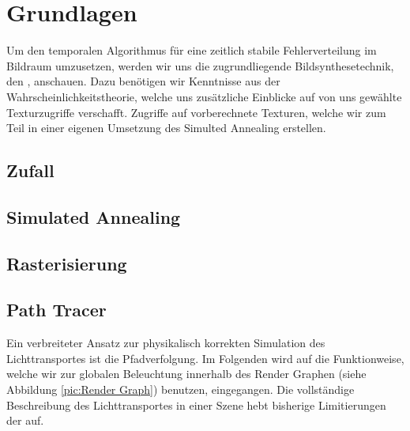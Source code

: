 \vfill
\chapter{Grundlagen}
\label{ch:Grundlagen}
Um den temporalen Algorithmus für eine zeitlich stabile  Fehlerverteilung im Bildraum umzusetzen, werden wir uns 
die zugrundliegende Bildsynthesetechnik, den , anschauen. Dazu benötigen wir Kenntnisse aus der Wahrscheinlichkeitstheorie, welche 
uns zusätzliche Einblicke auf von uns gewählte Texturzugriffe verschafft. Zugriffe auf vorberechnete Texturen, welche wir zum Teil in einer eigenen Umsetzung des
Simulted Annealing erstellen.


\section{Zufall}
\label{ch:Content1:sec:Zufall}


\newpage
\section{Simulated Annealing}
\label{ch:Content2:sec:Simulated Annealing}


\newpage
\section{Rasterisierung}
\label{ch:Content1:sec:Rasterisierung}



\newpage
\section{Path Tracer}
\label{ch:Content1:sec:Path Tracer}
\vspace*{2cm}
Ein verbreiteter Ansatz zur physikalisch korrekten Simulation des Lichttransportes ist die Pfadverfolgung. Im Folgenden wird auf die Funktionweise, welche wir 
zur globalen Beleuchtung innerhalb des Render Graphen (siehe Abbildung \ref{pic:Render Graph}) benutzen, eingegangen. Die vollständige 
Beschreibung des Lichttransportes in einer Szene hebt bisherige Limitierungen der  auf. 
\par


